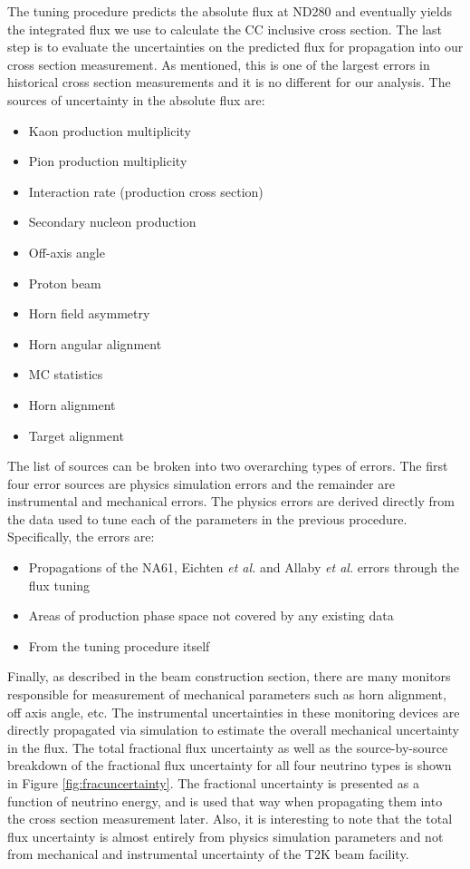 The tuning procedure predicts the absolute flux at ND280 and eventually yields the integrated flux we use to calculate the CC inclusive cross section. The last step is to evaluate the uncertainties on the predicted flux for propagation into our cross section measurement. As mentioned, this is one of the largest errors in historical cross section measurements and it is no different for our analysis. The sources of uncertainty in the absolute flux are:

\begin{itemize}
\item Kaon production multiplicity
\item Pion production multiplicity
\item Interaction rate (production cross section)
\item Secondary nucleon production
\item Off-axis angle
\item Proton beam
\item Horn field asymmetry
\item Horn angular alignment
\item MC statistics
\item Horn alignment
\item Target alignment
\end{itemize}

The list of sources can be broken into two overarching types of errors. The first four error sources are physics simulation errors and the remainder are instrumental and mechanical errors. The physics errors are derived directly from the data used to tune each of the parameters in the previous procedure. Specifically, the errors are:

\begin{itemize}
\item Propagations of the NA61, Eichten {\it et al.} and Allaby {\it et al.} errors through the flux tuning
\item Areas of production phase space not covered by any existing data
\item From the tuning procedure itself
\end{itemize}

Finally, as described in the beam construction section, there are many monitors responsible for measurement of mechanical parameters such as horn alignment, off axis angle, etc. The instrumental uncertainties in these monitoring devices are directly propagated via simulation to estimate the overall mechanical uncertainty in the flux. The total fractional flux uncertainty as well as the source-by-source breakdown of the fractional flux uncertainty for all four neutrino types is shown in Figure \ref{fig:fracuncertainty}. The fractional uncertainty is presented as a function of neutrino energy, and is used that way when propagating them into the cross section measurement later. Also, it is interesting to note that the total flux uncertainty is almost entirely from physics simulation parameters and not from mechanical and instrumental uncertainty of the T2K beam facility.

